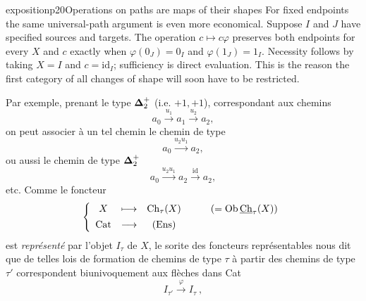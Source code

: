 \begin{dcomment}{exposition}{p20}{Operations on paths are maps of their shapes}
For fixed endpoints the same universal-path argument is even more economical. Suppose $I$ and $J$ have specified sources and targets. The operation $c\mapsto c\varphi$ preserves both endpoints for every $X$ and $c$ exactly when $\varphi(0_J)=0_I$ and $\varphi(1_J)=1_I$. Necessity follows by taking $X=I$ and $c=\mathrm{id}_I$; sufficiency is direct evaluation. This is the reason the first category of all changes of shape will soon have to be restricted.
\end{dcomment}


Par exemple, prenant le type $\boldsymbol{\Delta}_2^+$ (i.e. $+1,+1$), correspondant aux chemins
\[
a_0 \xrightarrow{u_1} a_1 \xrightarrow{u_2} a_2,
\]
on peut associer à un tel chemin le chemin de type
\[
a_0 \xrightarrow{u_2u_1} a_2,
\]
ou aussi le chemin de type $\boldsymbol{\Delta}_2^+$
\[
a_0 \xrightarrow{u_2u_1} a_2 \xrightarrow{\mathrm{id}} a_2,
\]
etc. Comme le foncteur
\[
\left\{
\begin{array}{cccl}
X & \longmapsto & \mathrm{Ch}_\tau(X) & \qquad (= \mathrm{Ob}\, \underline{\mathrm{Ch}}_\tau(X)) \\[1ex]
\mathrm{Cat} & \longrightarrow & (\mathrm{Ens}) &
\end{array}
\right.
\]
est \textit{représenté} par l'objet $I_\tau$ de $X$, le sorite des foncteurs représentables nous dit que de telles lois de formation de chemins de type $\tau$ à partir des chemins de type $\tau'$ correspondent biunivoquement aux flèches dans Cat
\[
I_{\tau'} \xrightarrow{\varphi} I_\tau\ ,
\]



